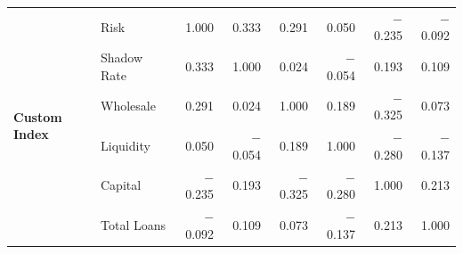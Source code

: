 \documentclass[12pt,a4paper]{report}\usepackage[a4paper, top=2.5cm, bottom=2.5cm, left=2.5cm, right=2.5cm]{geometry}
\begin{document}
\begin{table}[H]
{\begin{tabular}{ll rrrrrr}
\multirow{6}{*}{\textbf{Custom Index}}
 & Risk          &  1.000 &  0.333 &  0.291 &  0.050 & $-$0.235 & $-$0.092 \\
 & Shadow Rate   &  0.333 &  1.000 &  0.024 & $-$0.054 &  0.193 &  0.109 \\
 & Wholesale     &  0.291 &  0.024 &  1.000 &  0.189 & $-$0.325 &  0.073 \\
 & Liquidity     &  0.050 & $-$0.054 &  0.189 &  1.000 & $-$0.280 & $-$0.137 \\
 & Capital       & $-$0.235 &  0.193 & $-$0.325 & $-$0.280 &  1.000 &  0.213 \\
 & Total Loans   & $-$0.092 &  0.109 &  0.073 & $-$0.137 &  0.213 &  1.000 \\

\bottomrule
\end{tabular}%
}
\end{table}
\end{document}
